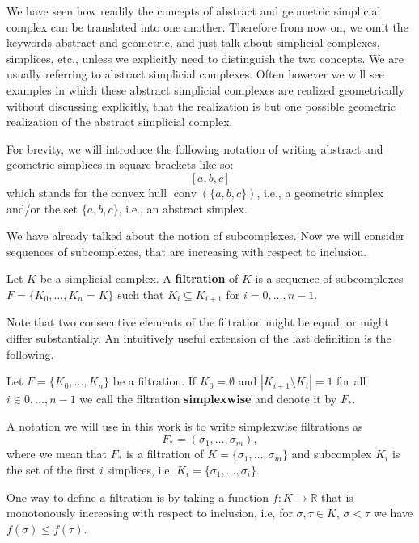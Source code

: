 We have seen how readily the concepts of abstract and geometric simplicial complex can be translated into one another. Therefore from now on, we omit the keywords abstract and geometric, and just talk about simplicial complexes, simplices, etc., unless we explicitly need to distinguish the two concepts. We are usually referring to abstract simplicial complexes. Often however we will see examples in which these abstract simplicial complexes are realized geometrically without discussing explicitly, that the realization is but one possible geometric realization of the abstract simplicial complex.

For brevity, we will introduce the following notation of writing abstract and geometric simplices in square brackets like so: \[
[a,b,c]
\] which stands for the convex hull $\operatorname{conv}(\{a,b,c\})$, i.e., a geometric simplex and/or the set $\{a,b,c\}$, i.e., an abstract simplex.


We have already talked about the notion of subcomplexes. Now we will consider sequences of subcomplexes, that are increasing with respect to inclusion. 

\begin{defi}
\label{def:filtration}
Let $K$ be a simplicial complex. A \textbf{filtration} of $K$ is a sequence of subcomplexes $F = \{K_0, \dots, K_n = K\}$ such that $K_i \subseteq K_{i+1}$ for $i = 0, \dots, n-1$.
\end{defi}

Note that two consecutive elements of the filtration might be equal, or might differ substantially. An intuitively useful extension of the last definition is the following. 
\begin{defi}
Let $F = \{K_0, \dots ,K_n\}$ be a filtration. If $K_0 = \emptyset$ and $|K_{i+1} \setminus K_i| = 1$ for all $i \in 0, \dots ,n-1$ we call the filtration \textbf{simplexwise} and denote it by $F_*$.
\end{defi}
A notation we will use in this work is to write simplexwise filtrations as \[
    F_* = (\sigma_1, \dots , \sigma_m),
\] where we mean that $F_*$ is a filtration of $K = \{\sigma_1, \dots, \sigma_m\}$ and subcomplex $K_i$ is the set of the first $i$ simplices, i.e. $K_i = \{\sigma_1, \dots ,\sigma_i\}$.

One way to define a filtration is by taking a function $f: K \rightarrow \mathbb{R}$ that is monotonously increasing with respect to inclusion, i.e, for $\sigma, \tau \in K$, $\sigma < \tau$ we have $f(\sigma) \leq f(\tau)$.


